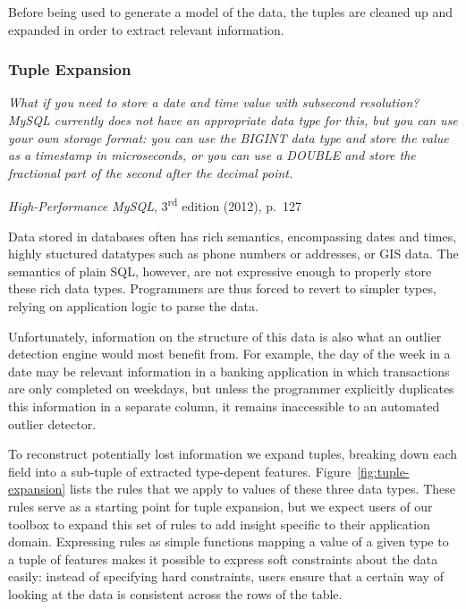 
Before being used to generate a model of the data, the tuples are cleaned up and expanded in order to extract relevant information. 

\subsubsection{Tuple Expansion}

\noindent\begin{minipage}{0.8\linewidth}
  \itshape
  What if you need to store a date and time value with subsecond resolution? MySQL
  currently does not have an appropriate data type for this, but you can use your own
  storage format: you can use the BIGINT data type and store the value as a timestamp in
  microseconds, or you can use a DOUBLE and store the fractional part of the second after
  the decimal point.
\end{minipage}
\begin{flushright}
  \textit{High-Performance MySQL}, 3\textsuperscript{rd} edition (2012), p.~127
\end{flushright}

Data stored in databases often has rich semantics, encompassing dates and times, highly stuctured datatypes such as phone numbers or addresses, or GIS data. The semantics of plain SQL, however, are not expressive enough to properly store these rich data types. Programmers are thus forced to revert to simpler types, relying on application logic to parse the data. 

Unfortunately, information on the structure of this data is also what an outlier detection engine would most benefit from. For example, the day of the week in a date may be relevant information in a banking application in which transactions are only completed on weekdays, but unless the programmer explicitly duplicates this information in a separate column, it remains inaccessible to an automated outlier detector.

To reconstruct potentially lost information we expand tuples, breaking down each field into a sub-tuple of extracted type-depent features. Figure~\ref{fig:tuple-expansion} lists the rules that we apply to values of these three data types. These rules serve as a starting point for tuple expansion, but we expect users of our toolbox to expand this set of rules to add insight specific to their application domain. Expressing rules as simple functions mapping a value of a given type to a tuple of features makes it possible to express soft constraints about the data easily: instead of specifying hard constraints, users ensure that a certain way of looking at the data is consistent across the rows of the table.

